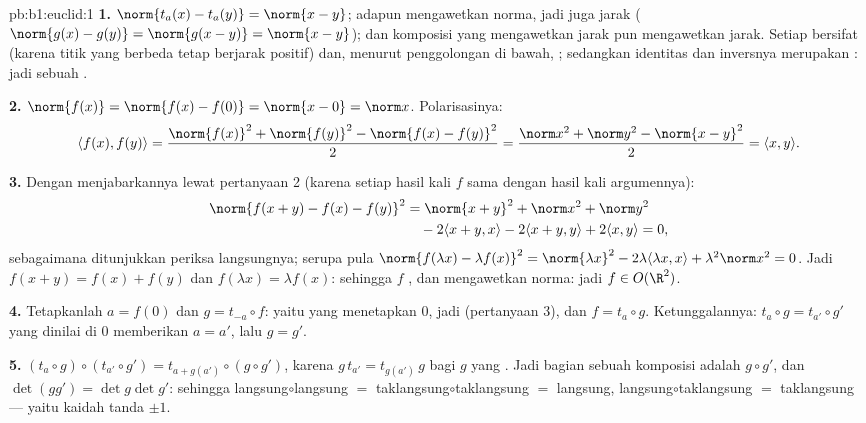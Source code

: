 \begin{solution}{pb:b1:euclid:1}
\textbf{1.} $\norm{t_a(x) - t_a(y)} = \norm{x - y}$; adapun 
 mengawetkan norma, jadi juga jarak ($\norm{g(x) - g(y)} =
\norm{g(x - y)} = \norm{x-y}$); dan komposisi 
yang mengawetkan jarak pun mengawetkan jarak. Setiap  bersifat
 (karena titik yang berbeda tetap berjarak positif) dan, menurut
penggolongan di bawah, ; sedangkan identitas dan inversnya
merupakan : jadi sebuah .

\textbf{2.} $\norm{f(x)} = \norm{f(x) - f(0)} = \norm{x - 0} =
\norm x$. Polarisasinya:
\[
\langle f(x), f(y)\rangle
= \frac{\norm{f(x)}^2 + \norm{f(y)}^2 - \norm{f(x) -
f(y)}^2}{2}
= \frac{\norm x^2 + \norm y^2 - \norm{x - y}^2}{2}
= \langle x, y\rangle .
\]

\textbf{3.} Dengan menjabarkannya lewat pertanyaan 2 (karena setiap hasil kali $f$
sama dengan hasil kali argumennya):
\begin{align*}
\norm{f(x+y) - f(x) - f(y)}^2
&= \norm{x+y}^2 + \norm x^2 + \norm y^2\\
&\quad - 2\langle x+y, x\rangle - 2\langle x+y, y\rangle
+ 2\langle x, y\rangle = 0 ,
\end{align*}
sebagaimana ditunjukkan periksa langsungnya; serupa pula $\norm{f(\lambda x) -
\lambda f(x)}^2 = \norm{\lambda x}^2 - 2\lambda\langle \lambda
x, x\rangle + \lambda^2\norm x^2 = 0$. Jadi $f(x + y) = f(x) +
f(y)$ dan $f(\lambda x) = \lambda f(x)$: sehingga $f$ , dan
mengawetkan norma: jadi $f \in O(\R^2)$.

\textbf{4.} Tetapkanlah $a = f(0)$ dan $g = t_{-a}\circ f$: yaitu 
yang menetapkan $0$, jadi   (pertanyaan 3), dan $f = t_a
\circ g$. Ketunggalannya: $t_a \circ g = t_{a'}\circ g'$ yang dinilai
di $0$ memberikan $a = a'$, lalu $g = g'$.

\textbf{5.} $(t_a\circ g)\circ(t_{a'}\circ g') = t_{a +
g(a')}\circ(g\circ g')$, karena $g\,t_{a'} = t_{g(a')}\,g$ bagi
$g$ yang . Jadi bagian  sebuah komposisi adalah $g \circ g'$,
dan $\det(gg') = \det g \det g'$: sehingga langsung$\circ$langsung $=$
taklangsung$\circ$taklangsung $=$ langsung,
langsung$\circ$taklangsung $=$ taklangsung --- yaitu kaidah tanda $\pm1$.


\end{solution}
